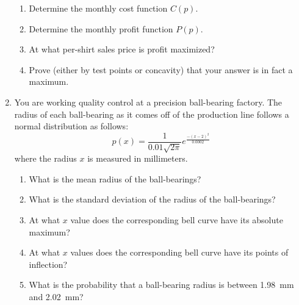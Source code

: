 \documentclass[letterpaper,12pt,fleqn]{article}
\begin{document}
\begin{enumerate}[left=0pt]
\begin{enumerate}
  \item Determine the monthly cost function \(C(p)\).

    \vspace{1in}

  \item Determine the monthly profit function \(P(p)\).

    \vspace{1.25in}

  \item At what per-shirt sales price is profit maximized?

    \vspace{2in}

  \item Prove (either by test points or concavity) that your answer is in fact a maximum.
  \end{enumerate}

  \newpage

\item You are working quality control at a precision ball-bearing factory.  The radius of each ball-bearing as it comes off of
  the production line follows a normal distribution as follows:
  \[p(x)=\frac{1}{0.01\sqrt{2\pi}}e^{\frac{-(x-2)^2}{0.0002}}\]
  where the radius \(x\) is measured in millimeters.
  \begin{enumerate}
  \item What is the mean radius of the ball-bearings?

    \vspace{1in}

  \item What is the standard deviation of the radius of the ball-bearings?

    \vspace{1in}

  \item At what \(x\) value does the corresponding bell curve have its absolute maximum?

    \vspace{1in}

  \item At what \(x\) values does the corresponding bell curve have its points of inflection?

    \vspace{1in}

  \item What is the probability that a ball-bearing radius is between \SI{1.98}{mm} and \SI{2.02}{mm}?
  \end{enumerate}


\end{enumerate}
\end{document}
